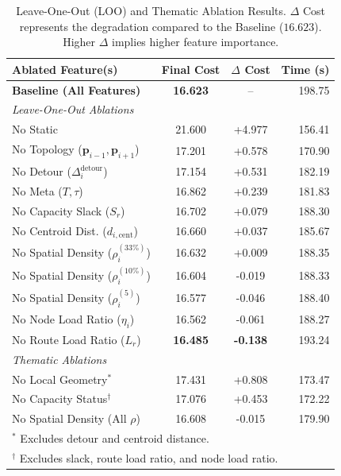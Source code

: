 \documentclass[letterpaper]{article} %
\begin{document}
\begin{table}[h]
\centering
\small
\setlength{\tabcolsep}{4pt}
\caption{Leave-One-Out (LOO) and Thematic Ablation Results. $\Delta$ Cost represents the degradation compared to the Baseline ($16.623$). Higher $\Delta$ implies higher feature importance.}
\label{tab:loo_ablation}
\begin{tabular}{l c c r}
\toprule
\textbf{Ablated Feature(s)} & \textbf{Final Cost} & \textbf{$\Delta$ Cost} & \textbf{Time (s)} \\
\midrule
\textbf{Baseline (All Features)} & \textbf{16.623} & -- & 198.75 \\
\midrule
\textit{Leave-One-Out Ablations} & & & \\
No Static & 21.600 & +4.977 & 156.41 \\
No Topology ($\mathbf{p}_{i-1}, \mathbf{p}_{i+1}$) & 17.201 & +0.578 & 170.90 \\
No Detour ($\Delta^{\text{detour}}_i$) & 17.154 & +0.531 & 182.19 \\
No Meta ($T, \tau$) & 16.862 & +0.239 & 181.83 \\
No Capacity Slack ($S_r$) & 16.702 & +0.079 & 188.30 \\
No Centroid Dist. ($d_{i, \text{cent}}$) & 16.660 & +0.037 & 185.67 \\
No Spatial Density ($\rho^{(33\%)}_i$) & 16.632 & +0.009 & 188.35 \\
No Spatial Density ($\rho^{(10\%)}_i$) & 16.604 & -0.019 & 188.33 \\
No Spatial Density ($\rho^{(5)}_i$) & 16.577 & -0.046 & 188.40 \\
No Node Load Ratio ($\eta_i$) & 16.562 & -0.061 & 188.27 \\
No Route Load Ratio ($L_r$) & \textbf{16.485} & \textbf{-0.138} & 193.24 \\
\midrule
\textit{Thematic Ablations} & & & \\
No Local Geometry$^*$ & 17.431 & +0.808 & 173.47 \\
No Capacity Status$^\dagger$ & 17.076 & +0.453 & 172.22 \\
No Spatial Density (All $\rho$) & 16.608 & -0.015 & 179.90 \\
\bottomrule
\multicolumn{4}{l}{\scriptsize $^*$ Excludes detour and centroid distance.} \\
\multicolumn{4}{l}{\scriptsize $^\dagger$ Excludes slack, route load ratio, and node load ratio.}
\end{tabular}
\end{table}
\end{document}
